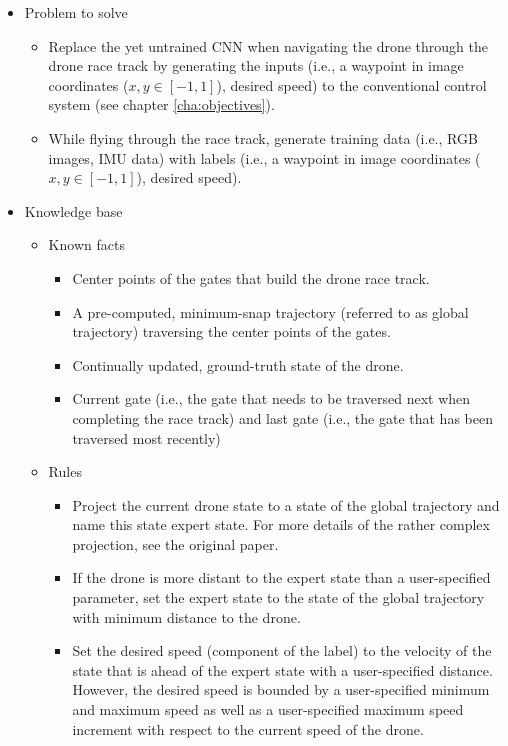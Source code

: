 \begin{itemize}
	\item Problem to solve
	\begin{itemize}
		\item Replace the yet untrained CNN when navigating the drone through the drone race track by
		generating the inputs (i.e., a waypoint in image coordinates ($x, y \in [-1, 1]$), desired speed) 
		to the conventional control system (see chapter \ref{cha:objectives}).
		\item While flying through the race track, 
		generate training data (i.e., RGB images, IMU data) 
		with labels (i.e., a waypoint in image coordinates ($x, y \in [-1, 1]$), desired speed).
	\end{itemize}
	\item Knowledge base
	\begin{itemize}
		\item Known facts
		\begin{itemize}
			\item Center points of the gates that build the drone race track.
			\item A pre-computed, minimum-snap trajectory (referred to as global trajectory) traversing the center points of the gates.
			\item Continually updated, ground-truth state of the drone.
			\item Current gate (i.e., the gate that needs to be traversed next when completing the race track) 
			and last gate (i.e., the gate that has been traversed most recently)
		\end{itemize}
		\item Rules
		\begin{itemize}
			\item Project the current drone state to a state of the global trajectory and name this state expert state. 
			For more details of the rather complex projection, see the original paper.
			\item If the drone is more distant to the expert state than a user-specified parameter, 
			set the expert state to the state of the global trajectory with minimum distance to the drone.
			\item Set the desired speed (component of the label) to the velocity of the state 
			that is ahead of the expert state with a user-specified distance. 
			However, the desired speed is bounded by a user-specified minimum and maximum speed 
			as well as a user-specified maximum speed increment with respect to the current speed of the drone.

\end{itemize}
\end{itemize}
\end{itemize}
